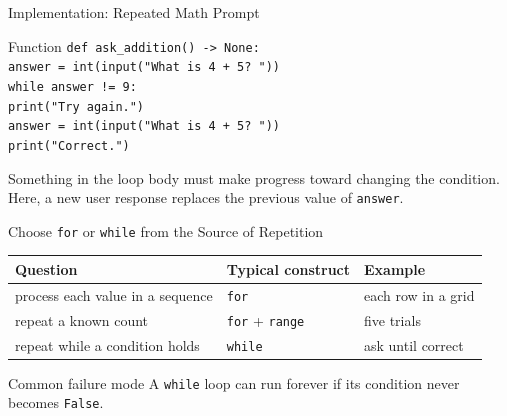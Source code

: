 \documentclass[aspectratio=169,10pt]{beamer}
\begin{document}
\begin{frame}{Implementation: Repeated Math Prompt}
  \begin{block}{Function}
    \texttt{def ask\_addition() -> None:}\\
    \hspace*{0.20in}\texttt{answer = int(input("What is 4 + 5? "))}\\
    \hspace*{0.20in}\texttt{while answer != 9:}\\
    \hspace*{0.40in}\texttt{print("Try again.")}\\
    \hspace*{0.40in}\texttt{answer = int(input("What is 4 + 5? "))}\\
    \hspace*{0.20in}\texttt{print("Correct.")}
  \end{block}

  \begin{keyidea}
    Something in the loop body must make progress toward changing the condition. Here, a new user response replaces the previous value of \texttt{answer}.
  \end{keyidea}
\end{frame}

\begin{frame}{Choose \texttt{for} or \texttt{while} from the Source of Repetition}
  \begin{center}
    \renewcommand{\arraystretch}{1.30}
    \begin{tabular}{l|l|l}
      \textbf{Question} & \textbf{Typical construct} & \textbf{Example} \\\hline
      process each value in a sequence & \texttt{for} & each row in a grid \\
      repeat a known count & \texttt{for} + \texttt{range} & five trials \\
      repeat while a condition holds & \texttt{while} & ask until correct
    \end{tabular}
  \end{center}

  \begin{alertblock}{Common failure mode}
    A \texttt{while} loop can run forever if its condition never becomes \texttt{False}.
  \end{alertblock}
\end{frame}

\end{document}
